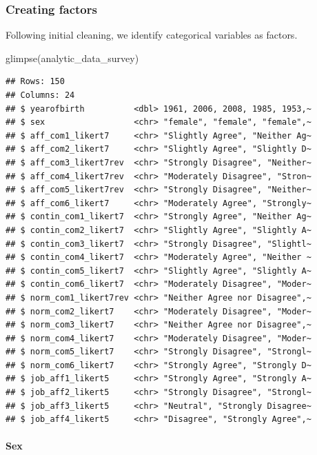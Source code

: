 \documentclass[
]{krantz}
\makeatletter
\newenvironment{Shaded}{\begin{snugshade}}{\end{snugshade}}
\newcommand{\FunctionTok}[1]{\textcolor[rgb]{0,0,0}{#1}}
\newcommand{\NormalTok}[1]{#1}
\newenvironment{kframe}{%
\medskip{}
\setlength{\fboxsep}{.8em}
 \def\at@end@of@kframe{}%
 \ifinner\ifhmode%
  \def\at@end@of@kframe{\end{minipage}}%
  \begin{minipage}{\columnwidth}%
 \fi\fi%
 \def\FrameCommand##1{\hskip\@totalleftmargin \hskip-\fboxsep
 \colorbox{shadecolor}{##1}\hskip-\fboxsep
     \hskip-\linewidth \hskip-\@totalleftmargin \hskip\columnwidth}%
 \MakeFramed {\advance\hsize-\width
   \@totalleftmargin\z@ \linewidth\hsize
   \@setminipage}}%
 {\par\unskip\endMakeFramed%
 \at@end@of@kframe}
\renewenvironment{Shaded}{\begin{kframe}}{\end{kframe}}
\makeatother
\begin{document}
\hypertarget{creating-factors-1}{%
\subsubsection{Creating factors}\label{creating-factors-1}}

Following initial cleaning, we identify categorical variables as factors.

\begin{Shaded}
\begin{Highlighting}[]
\FunctionTok{glimpse}\NormalTok{(analytic\_data\_survey)}
\end{Highlighting}
\end{Shaded}

\begin{verbatim}
## Rows: 150
## Columns: 24
## $ yearofbirth          <dbl> 1961, 2006, 2008, 1985, 1953,~
## $ sex                  <chr> "female", "female", "female",~
## $ aff_com1_likert7     <chr> "Slightly Agree", "Neither Ag~
## $ aff_com2_likert7     <chr> "Slightly Agree", "Slightly D~
## $ aff_com3_likert7rev  <chr> "Strongly Disagree", "Neither~
## $ aff_com4_likert7rev  <chr> "Moderately Disagree", "Stron~
## $ aff_com5_likert7rev  <chr> "Strongly Disagree", "Neither~
## $ aff_com6_likert7     <chr> "Moderately Agree", "Strongly~
## $ contin_com1_likert7  <chr> "Strongly Agree", "Neither Ag~
## $ contin_com2_likert7  <chr> "Slightly Agree", "Slightly A~
## $ contin_com3_likert7  <chr> "Strongly Disagree", "Slightl~
## $ contin_com4_likert7  <chr> "Moderately Agree", "Neither ~
## $ contin_com5_likert7  <chr> "Slightly Agree", "Slightly A~
## $ contin_com6_likert7  <chr> "Moderately Disagree", "Moder~
## $ norm_com1_likert7rev <chr> "Neither Agree nor Disagree",~
## $ norm_com2_likert7    <chr> "Moderately Disagree", "Moder~
## $ norm_com3_likert7    <chr> "Neither Agree nor Disagree",~
## $ norm_com4_likert7    <chr> "Moderately Disagree", "Moder~
## $ norm_com5_likert7    <chr> "Strongly Disagree", "Strongl~
## $ norm_com6_likert7    <chr> "Strongly Agree", "Strongly D~
## $ job_aff1_likert5     <chr> "Strongly Agree", "Strongly A~
## $ job_aff2_likert5     <chr> "Strongly Disagree", "Strongl~
## $ job_aff3_likert5     <chr> "Neutral", "Strongly Disagree~
## $ job_aff4_likert5     <chr> "Disagree", "Strongly Agree",~
\end{verbatim}

\hypertarget{sex}{%
\paragraph{Sex}\label{sex}}
\end{document}
